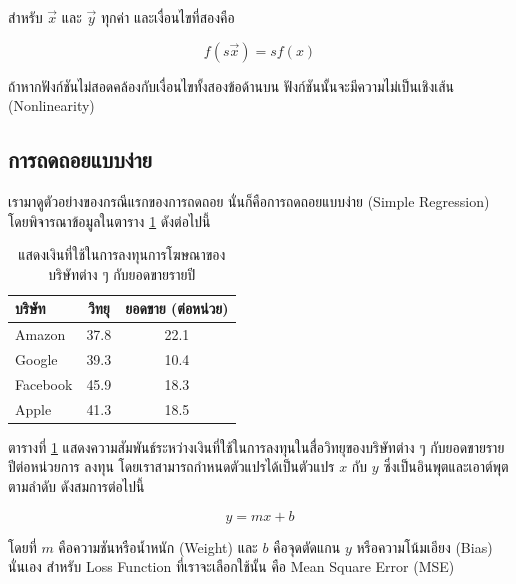 \noindent สำหรับ $\vec{x}$ และ $\vec{y}$ ทุกค่า และเงื่อนไขที่สองคือ

\begin{equation}
    f(s\vec{x}) = sf(x)
\end{equation}

ถ้าหากฟังก์ชันไม่สอดคล้องกับเงื่อนไขทั้งสองข้อด้านบน ฟังก์ชันนั้นจะมีความไม่เป็นเชิงเส้น (Nonlinearity)

\subsection{การถดถอยแบบง่าย}
\label{ssec:simple_lin_res}

เรามาดูตัวอย่างของกรณีแรกของการถดถอย นั่นก็คือการถดถอยแบบง่าย (Simple Regression) โดยพิจารณาข้อมูลในตาราง
\ref{tab:simple_reg_data} ดังต่อไปนี้

\begin{table}[H]
    \centering
    \caption{แสดงเงินที่ใช้ในการลงทุนการโฆษณาของบริษัทต่าง ๆ กับยอดขายรายปี}
    \label{tab:simple_reg_data}
    \begin{tabular}{lcc}
        \toprule
        \textbf{บริษัท} & \textbf{วิทยุ} & \textbf{ยอดขาย (ต่อหน่วย)} \\
        \midrule
        Amazon        & 37.8         & 22.1                     \\
        Google        & 39.3         & 10.4                     \\
        Facebook      & 45.9         & 18.3                     \\
        Apple         & 41.3         & 18.5                     \\
        \bottomrule
    \end{tabular}
\end{table}

ตารางที่ \ref{tab:simple_reg_data} แสดงความสัมพันธ์ระหว่างเงินที่ใช้ในการลงทุนในสื่อวิทยุของบริษัทต่าง ๆ กับยอดขายรายปีต่อหน่วยการ%
ลงทุน โดยเราสามารถกำหนดตัวแปรได้เป็นตัวแปร $x$ กับ $y$ ซึ่งเป็นอินพุตและเอาต์พุตตามลำดับ ดังสมการต่อไปนี้

\begin{equation}
    y = mx + b
\end{equation}

\noindent โดยที่ $m$ คือความชันหรือน้ำหนัก (Weight) และ $b$ คือจุดตัดแกน $y$ หรือความโน้มเอียง (Bias) นั่นเอง สำหรับ Loss
Function ที่เราจะเลือกใช้นั้น คือ Mean Square Error (MSE)

